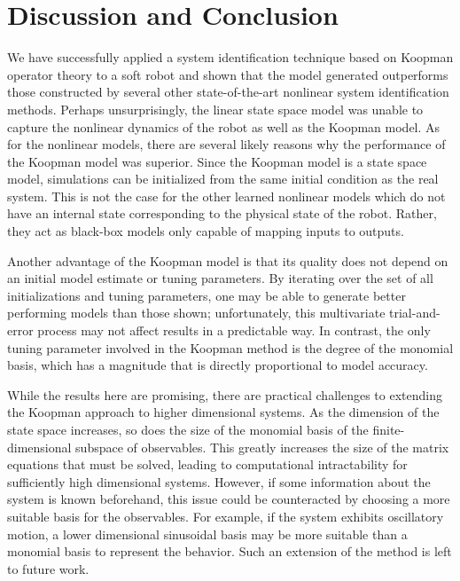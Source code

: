 \section{Discussion and Conclusion}
\label{sec:conclusion}

We have successfully applied a system identification technique based on Koopman operator theory to a soft robot and shown that the model generated outperforms those constructed by several other state-of-the-art nonlinear system identification methods.
Perhaps unsurprisingly, the linear state space model was unable to capture the nonlinear dynamics of the robot as well as the Koopman model.
As for the nonlinear models, there are several likely reasons why the performance of the Koopman model was superior.
Since the Koopman model is a state space model, simulations can be initialized from the same initial condition as the real system.
This is not the case for the other learned nonlinear models which do not have an internal state corresponding to the physical state of the robot.
Rather, they act as black-box models only capable of mapping inputs to outputs.

Another advantage of the Koopman model is that its quality does not depend on an initial model estimate or tuning parameters.
By iterating over the set of all initializations and tuning parameters, one may be able to generate better performing models than those shown; unfortunately, this multivariate trial-and-error process may not affect results in a predictable way.
In contrast, the only tuning parameter involved in the Koopman method is the degree of the monomial basis, which has a magnitude that is directly proportional to model accuracy. 

While the results here are promising, there are practical challenges to extending the Koopman approach to higher dimensional systems.
As the dimension of the state space increases, so does the size of the monomial basis of the finite-dimensional subspace of observables.
This greatly increases the size of the matrix equations that must be solved, leading to computational intractability for sufficiently high dimensional systems.
However, if some information about the system is known beforehand, this issue could be counteracted by choosing a more suitable basis for the observables.
For example, if the system exhibits oscillatory motion, a lower dimensional sinusoidal basis may be more suitable than a monomial basis to represent the behavior.
Such an extension of the method is left to future work.

